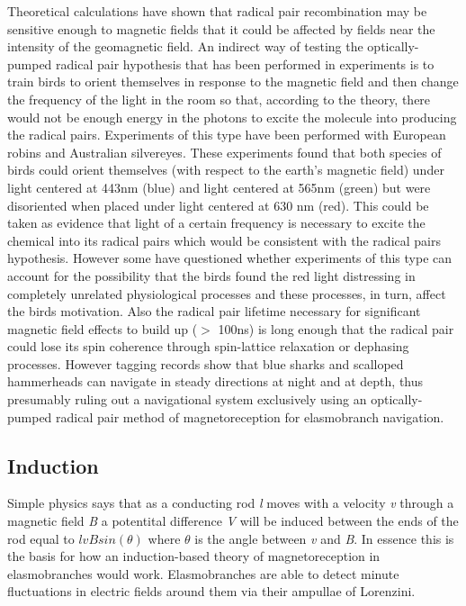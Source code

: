 \documentclass[12pt]{article}
\begin{document}
Theoretical calculations have shown that radical pair recombination may be sensitive enough to magnetic fields that it could be affected by fields near the intensity of the geomagnetic field\cite{Grissom:1995}. An indirect way of testing the optically-pumped radical pair hypothesis that has been performed in experiments is to train birds to orient themselves in response to the magnetic field and then change the frequency of the light in the room so that, according to the theory, there would not be enough energy in the photons to excite the molecule into producing the radical pairs. Experiments of this type have been performed with European robins and Australian silvereyes\cite{Wiltschko:1993}\cite{Wiltschko:1995}. These experiments found that both species of birds could orient themselves (with respect to the earth's magnetic field) under light centered at 443nm (blue) and light centered at 565nm (green) but were disoriented when placed under light centered at 630 nm (red). This could be taken as evidence that light of a certain frequency is necessary to excite the chemical into its radical pairs which would be consistent with the radical pairs hypothesis. However some have questioned whether experiments of this type can account for the possibility that the birds found the red light distressing in completely unrelated physiological processes and these processes, in turn, affect the birds motivation\cite{Johnsen:2005}\cite{Kirschvink:2001}. Also the radical pair lifetime necessary for significant magnetic field effects to build up ($>$ 100ns) is long enough that the radical pair could lose its spin coherence through spin-lattice relaxation or dephasing processes. However tagging records show that blue sharks and scalloped hammerheads can navigate in steady directions at night and at depth\cite{Carey:1990}\cite{Klimley:1993}\cite{Bonfil:2005}, thus presumably ruling out a navigational system exclusively using an optically-pumped radical pair method of magnetoreception for elasmobranch navigation.

\subsection{Induction}

Simple physics says that as a conducting rod \textit{l} moves with a velocity \textit{v} through a magnetic field \textit{B} a potentital difference \textit{V} will be induced between the ends of the rod equal to $lvBsin(\theta)$ where $\theta$ is the angle between \textit{v} and \textit{B}. In essence this is the basis for how an induction-based theory of magnetoreception in elasmobranches would work. Elasmobranches are able to detect minute fluctuations in electric fields around them via their ampullae of Lorenzini.
\end{document}
